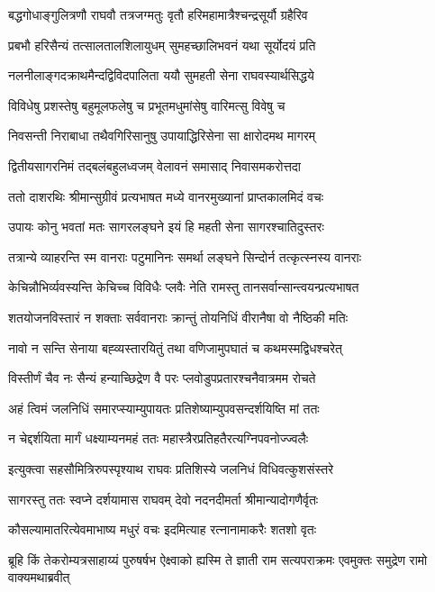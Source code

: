 \twolineshloka
{बद्धगोधाङ्गुलित्रणौ राघवौ तत्रजग्मतुः}
{वृतौ हरिमहामात्रैश्चन्द्रसूर्यौ ग्रहैरिव}


\twolineshloka
{प्रबभौ हरिसैन्यं तत्सालतालशिलायुधम्}
{सुमहच्छालिभवनं यथा सूर्योदयं प्रति}


\twolineshloka
{नलनीलाङ्गदक्राथमैन्दद्विविदपालिता}
{ययौ सुमहती सेना राघवस्यार्थसिद्धये}


\twolineshloka
{विविधेषु प्रशस्तेषु बहुमूलफलेषु च}
{प्रभूतमधुमांसेषु वारिमत्सु विवेषु च}


\twolineshloka
{निवसन्ती निराबाधा तथैवगिरिसानुषु}
{उपायाद्धिरिसेना सा क्षारोदमथ मागरम्}


\twolineshloka
{द्वितीयसागरनिमं तद्बलंबहुलध्वजम्}
{वेलावनं समासाद् निवासमकरोत्तदा}


\twolineshloka
{ततो दाशरथिः श्रीमान्सुग्रीवं प्रत्यभाषत}
{मध्ये वानरमुख्यानां प्राप्तकालमिदं वचः}


\twolineshloka
{उपायः कोनु भवतां मतः सागरलङ्घने}
{इयं हि महती सेना सागरश्चातिदुस्तरः}


\twolineshloka
{तत्रान्ये व्याहरन्ति स्म वानराः पटुमानिनः}
{समर्था लङ्घने सिन्दोर्न तत्कृत्स्नस्य वानराः}


\twolineshloka
{केचिन्नौभिर्व्यवस्यन्ति केचिच्च विविधैः प्लवैः}
{नेति रामस्तु तानसर्वान्सान्त्वयन्प्रत्यभाषत}


\twolineshloka
{शतयोजनविस्तारं न शक्ताः सर्ववानराः}
{क्रान्तुं तोयनिधिं वीरानैषा वो नैष्ठिकी मतिः}


\twolineshloka
{नावो न सन्ति सेनाया बह्व्यस्तारयितुं तथा}
{वणिजामुपघातं च कथमस्मद्विधश्चरेत्}


\twolineshloka
{विस्तीर्णं चैव नः सैन्यं हन्याच्छिद्रेण वै परः}
{प्लवोडुपप्रतारश्चनैवात्रमम रोचते}


\twolineshloka
{अहं त्विमं जलनिधिं समारप्स्याम्युपायतः}
{प्रतिशेष्याम्युपवसन्दर्शयिष्ति मां ततः}


\twolineshloka
{न चेद्दर्शयिता मार्गं धक्ष्याम्यनमहं ततः}
{महास्त्रैरप्रतिहतैरत्यग्निपवनोज्ज्वलैः}


\twolineshloka
{इत्युक्त्वा सहसौमित्रिरुपस्पृश्याथ राघवः}
{प्रतिशिस्ये जलनिधं विधिवत्कुशसंस्तरे}


\twolineshloka
{सागरस्तु ततः स्वप्ने दर्शयामास राघवम्}
{देवो नदनदीमर्ता श्रीमान्यादोगणैर्वृतः}


\twolineshloka
{कौसल्यामातरित्येवमाभाष्य मधुरं वचः}
{इदमित्याह रत्नानामाकरैः शतशो वृतः}


\threelineshloka
{ब्रूहि किं तेकरोम्यत्रसाहाय्यं पुरुषर्षभ}
{ऐक्ष्वाको ह्यस्मि ते ज्ञाती राम सत्यपराक्रमः}
{एवमुक्तः समुद्रेण रामो वाक्यमथाब्रवीत्}


